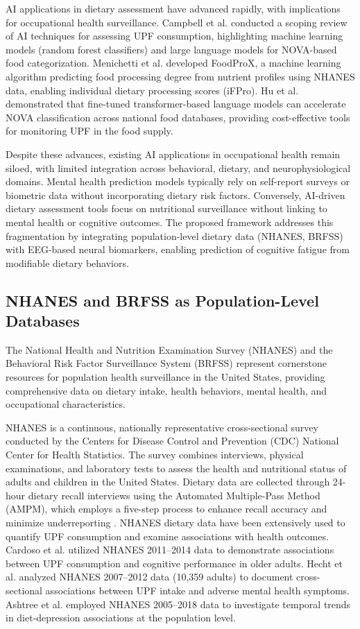 \documentclass[journal,twoside,10pt]{IEEEtran}
\begin{document}
AI applications in dietary assessment have advanced rapidly, with implications for occupational health surveillance. Campbell et al. \cite{ref1} conducted a scoping review of AI techniques for assessing UPF consumption, highlighting machine learning models (random forest classifiers) and large language models for NOVA-based food categorization. Menichetti et al. \cite{ref5} developed FoodProX, a machine learning algorithm predicting food processing degree from nutrient profiles using NHANES data, enabling individual dietary processing scores (iFPro). Hu et al. \cite{ref6} demonstrated that fine-tuned transformer-based language models can accelerate NOVA classification across national food databases, providing cost-effective tools for monitoring UPF in the food supply.

Despite these advances, existing AI applications in occupational health remain siloed, with limited integration across behavioral, dietary, and neurophysiological domains. Mental health prediction models typically rely on self-report surveys or biometric data without incorporating dietary risk factors. Conversely, AI-driven dietary assessment tools focus on nutritional surveillance without linking to mental health or cognitive outcomes. The proposed framework addresses this fragmentation by integrating population-level dietary data (NHANES, BRFSS) with EEG-based neural biomarkers, enabling prediction of cognitive fatigue from modifiable dietary behaviors.

\subsection{NHANES and BRFSS as Population-Level Databases}

The National Health and Nutrition Examination Survey (NHANES) and the Behavioral Risk Factor Surveillance System (BRFSS) represent cornerstone resources for population health surveillance in the United States, providing comprehensive data on dietary intake, health behaviors, mental health, and occupational characteristics.

NHANES is a continuous, nationally representative cross-sectional survey conducted by the Centers for Disease Control and Prevention (CDC) National Center for Health Statistics. The survey combines interviews, physical examinations, and laboratory tests to assess the health and nutritional status of adults and children in the United States. Dietary data are collected through 24-hour dietary recall interviews using the Automated Multiple-Pass Method (AMPM), which employs a five-step process to enhance recall accuracy and minimize underreporting \cite{ref18,ref26,ref47}. NHANES dietary data have been extensively used to quantify UPF consumption and examine associations with health outcomes. Cardoso et al. \cite{ref18} utilized NHANES 2011--2014 data to demonstrate associations between UPF consumption and cognitive performance in older adults. Hecht et al. \cite{ref20} analyzed NHANES 2007--2012 data (10,359 adults) to document cross-sectional associations between UPF intake and adverse mental health symptoms. Ashtree et al. \cite{ref26} employed NHANES 2005--2018 data to investigate temporal trends in diet-depression associations at the population level.
\end{document}
